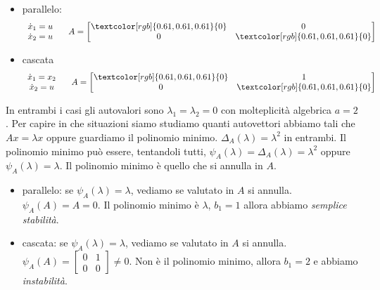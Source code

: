 \documentclass[10pt,a4paper]{book}
\begin{document}
\begin{itemize}
\item parallelo:\begin{equation*}
\begin{array}{ c }
\dot{x}_1 =u\\
\dot{x}_2 =u
\end{array} \ \ \ \ A=\begin{bmatrix}
\textcolor[rgb]{0.61,0.61,0.61}{0} & 0\\
0 & \textcolor[rgb]{0.61,0.61,0.61}{0}
\end{bmatrix}
\end{equation*}
\item cascata\begin{equation*}
\begin{array}{ c }
\dot{x}_1 =x_2\\
\dot{x}_2 =u
\end{array} \ \ \ \ A=\begin{bmatrix}
\textcolor[rgb]{0.61,0.61,0.61}{0} & 1\\
0 & \textcolor[rgb]{0.61,0.61,0.61}{0}
\end{bmatrix}
\end{equation*}
\end{itemize}

In entrambi i casi gli autovalori sono $\lambda _1 =\lambda _2 =0$ con molteplicità algebrica $a=2$. Per capire in che situazioni siamo studiamo quanti autovettori abbiamo tali che $Ax=\lambda x$ oppure guardiamo il polinomio minimo. $\Delta _A\left( \lambda \right) =\lambda ^2$ in entrambi. Il polinomio minimo può essere, tentandoli tutti, $\psi _A\left( \lambda \right) =\Delta _A\left( \lambda \right) =\lambda ^2$ oppure $\psi _A\left( \lambda \right) =\lambda $. Il polinomio minimo è quello che si annulla in $A$.
\begin{itemize}
\item parallelo: se $\psi _A\left( \lambda \right) =\lambda $, vediamo se valutato in $A$ si annulla. $\psi _A\left( A\right) =A=0$. Il polinomio minimo è $\lambda $, $b_1 =1$ allora abbiamo \textit{semplice stabilità}.
\item cascata: se $\psi _A\left( \lambda \right) =\lambda $, vediamo se valutato in $A$ si annulla. $\psi _A\left( A\right) =\begin{bmatrix}
0 & 1\\
0 & 0
\end{bmatrix} \neq 0$. Non è il polinomio minimo, allora $b_1 =2$ e abbiamo \textit{instabilità}.
\end{itemize}
\end{document}
